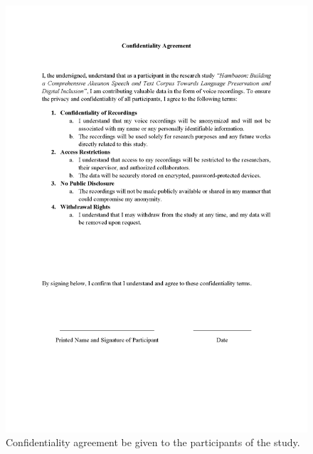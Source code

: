 \begin{figure}[h!]
    \centering
    \includegraphics[width=\textwidth]{./appendix/informed-consent-2.png}
    \caption{Confidentiality agreement be given to the participants of the study.}
    \label{fig:confidentialityAgreement}
\end{figure}

